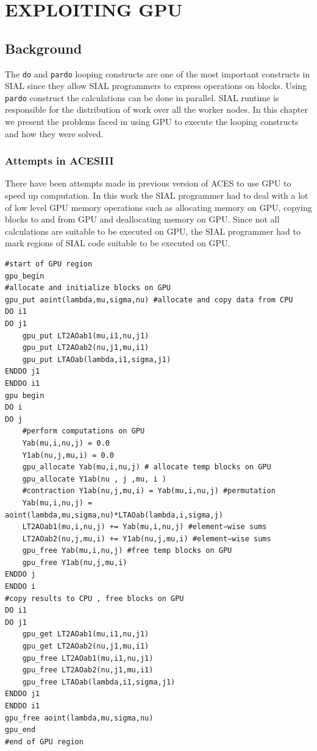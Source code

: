\chapter{EXPLOITING GPU}\label{exploitinggpu}
\section{Background}
The \texttt{do} and \texttt{pardo} looping constructs are one of the most important
constructs in SIAL since they allow SIAL programmers to express operations on
blocks. Using \texttt{pardo} construct the calculations can be done in parallel.
SIAL runtime is responsible for the distribution of work over all the worker nodes.
In this chapter we present the problems faced in using GPU to execute the looping
constructs and how they were solved.

\subsection{Attempts in ACESIII}
There have been attempts\cite{Jindal2016} made in previous version of ACES
to use GPU to speed up computation. In this work the SIAL programmer had to deal
with a lot of low level GPU memory operations such as allocating memory on GPU,
copying blocks to and from GPU and deallocating memory on GPU. Since not all
calculations are suitable to be executed on GPU, the SIAL programmer had to mark
regions of SIAL code suitable to be executed on GPU.

\begin{lstlisting}[caption={Code Fragment from ACESIII for CCSD calculation},
  label={lst:ACESIII_gpucode}]
#start of GPU region
gpu_begin
#allocate and initialize blocks on GPU
gpu_put aoint(lambda,mu,sigma,nu) #allocate and copy data from CPU
DO i1
DO j1
    gpu_put LT2AOab1(mu,i1,nu,j1)
    gpu_put LT2AOab2(nu,j1,mu,i1)
    gpu_put LTAOab(lambda,i1,sigma,j1)
ENDDO j1
ENDDO i1
gpu begin
DO i
DO j
    #perform computations on GPU
    Yab(mu,i,nu,j) = 0.0
    Y1ab(nu,j,mu,i) = 0.0
    gpu_allocate Yab(mu,i,nu,j) # allocate temp blocks on GPU
    gpu_allocate Y1ab(nu , j ,mu, i )
    #contraction Y1ab(nu,j,mu,i) = Yab(mu,i,nu,j) #permutation
    Yab(mu,i,nu,j) = aoint(lambda,mu,sigma,nu)*LTAOab(lambda,i,sigma,j)
    LT2AOab1(mu,i,nu,j) += Yab(mu,i,nu,j) #element−wise sums
    LT2AOab2(nu,j,mu,i) += Y1ab(nu,j,mu,i) #element−wise sums
    gpu_free Yab(mu,i,nu,j) #free temp blocks on GPU
    gpu_free Y1ab(nu,j,mu,i)
ENDDO j
ENDDO i
#copy results to CPU , free blocks on GPU
DO i1
DO j1
    gpu_get LT2AOab1(mu,i1,nu,j1)
    gpu_get LT2AOab2(nu,j1,mu,i1)
    gpu_free LT2AOab1(mu,i1,nu,j1)
    gpu_free LT2AOab2(nu,j1,mu,i1)
    gpu_free LTAOab(lambda,i1,sigma,j1)
ENDDO j1
ENDDO i1
gpu_free aoint(lambda,mu,sigma,nu)
gpu_end
#end of GPU region
\end{lstlisting}

